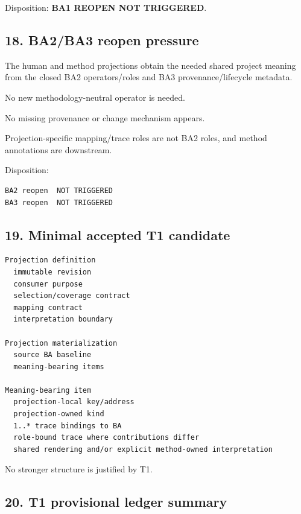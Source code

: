 \documentclass[11pt,a4paper]{article}
\begin{document}
Disposition: \textbf{BA1 REOPEN NOT TRIGGERED}.

\subsection{18. BA2/BA3 reopen pressure}\label{18-ba2ba3-reopen-pressure}

The human and method projections obtain the needed shared project meaning from the closed BA2 operators/roles and BA3 provenance/lifecycle metadata.

No new methodology-neutral operator is needed.

No missing provenance or change mechanism appears.

Projection-specific mapping/trace roles are not BA2 roles, and method annotations are downstream.

Disposition:

\begin{verbatim}
BA2 reopen  NOT TRIGGERED
BA3 reopen  NOT TRIGGERED
\end{verbatim}

\subsection{19. Minimal accepted T1 candidate}\label{19-minimal-accepted-t1-candidate}

\begin{verbatim}
Projection definition
  immutable revision
  consumer purpose
  selection/coverage contract
  mapping contract
  interpretation boundary

Projection materialization
  source BA baseline
  meaning-bearing items

Meaning-bearing item
  projection-local key/address
  projection-owned kind
  1..* trace bindings to BA
  role-bound trace where contributions differ
  shared rendering and/or explicit method-owned interpretation
\end{verbatim}

No stronger structure is justified by T1.

\subsection{20. T1 provisional ledger summary}\label{20-t1-provisional-ledger-summary}
\end{document}
